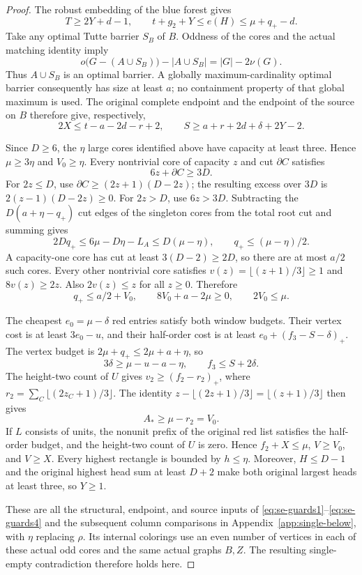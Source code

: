 \documentclass[11pt,a4paper]{article}
\theoremstyle{definition}
\begin{document}
\begin{proof}
The robust embedding of the blue forest gives
\[
 T\ge2Y+d-1,\qquad t+g_2+Y\le e(H)\le\mu+q_+-d.
\]
Take any optimal Tutte barrier $S_B$ of $B$.  Oddness of the cores and
the actual matching identity imply
\[
 o\bigl(G-(A\cup S_B)\bigr)-|A\cup S_B|
 =|G|-2\nu(G).
\]
Thus $A\cup S_B$ is an optimal barrier.  A globally maximum-cardinality
optimal barrier consequently has size at least $a$; no containment
property of that global maximum is used.
The original complete endpoint and the endpoint of the source on $B$
therefore give, respectively,
\[
 2X\le t-a-2d-r+2,\qquad
 S\ge a+r+2d+\delta+2Y-2.
\]

Since $D\ge6$, the $\eta$ large cores identified above have capacity
at least three.  Hence $\mu\ge3\eta$ and $V_0\ge\eta$.
Every nontrivial core of capacity $z$ and cut $\partial C$ satisfies
\[
 6z+\partial C\ge3D.
\]
For $2z\le D$, use $\partial C\ge(2z+1)(D-2z)$;
the resulting excess over $3D$ is $2(z-1)(D-2z)\ge0$.
For $2z>D$, use $6z>3D$.
Subtracting the $D(a+\eta-q_+)$ cut edges of the singleton cores
from the total root cut and summing gives
\[
 2Dq_+\le6\mu-D\eta-L_A\le D(\mu-\eta),
 \qquad q_+\le(\mu-\eta)/2.
\]
A capacity-one core has cut at least $3(D-2)\ge2D$, so there are
at most $a/2$ such cores.  Every other nontrivial core satisfies
$v(z)=\lfloor(z+1)/3\rfloor\ge1$ and $8v(z)\ge2z$.
Also $2v(z)\le z$ for all $z\ge0$.  Therefore
\[
 q_+\le a/2+V_0,\qquad 8V_0+a-2\mu\ge0,
 \qquad 2V_0\le\mu.
\]

The cheapest $e_0=\mu-\delta$ red entries satisfy both window budgets.
Their vertex cost is at least $3e_0-u$, and their half-order cost is
at least $e_0+(f_3-S-\delta)_+$.
The vertex budget is $2\mu+q_+\le2\mu+a+\eta$, so
\[
 3\delta\ge\mu-u-a-\eta,
 \qquad f_3\le S+2\delta.
\]
The height-two count of $U$ gives $v_2\ge(f_2-r_2)_+$, where
$r_2=\sum_C\lfloor(2z_C+1)/3\rfloor$.
The identity
$z-\lfloor(2z+1)/3\rfloor=\lfloor(z+1)/3\rfloor$
then gives
\[
 A_*\ge\mu-r_2=V_0.
\]
If $L$ consists of units, the nonunit prefix of the original red list
satisfies the half-order budget, and the height-two count of $U$ is zero.  Hence
$f_2+X\le\mu$, $V\ge V_0$, and $V\ge X$.
Every highest rectangle is bounded by $h\le\eta$.
Moreover, $H\le D-1$ and the original highest head sum at least $D+2$
make both original largest heads at least three, so $Y\ge1$.

These are all the structural, endpoint, and source inputs of
\eqref{eq:se-guards1}--\eqref{eq:se-guards4} and the subsequent column
comparisons in Appendix~\ref{app:single-below}, with $\eta$ replacing
$\rho$.  Its internal colorings use an even number of vertices in
each of these actual odd cores and the same actual graphs $B,Z$.
The resulting single-empty contradiction therefore holds here.


\end{proof}
\end{document}
